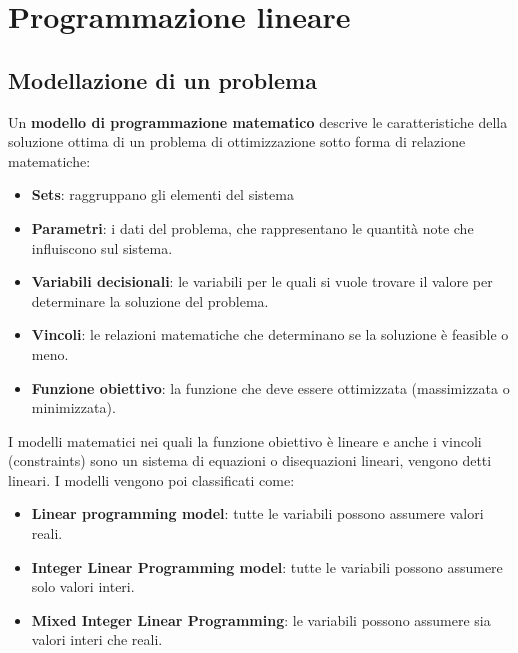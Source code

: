 


\chapter{Programmazione lineare}

\section{Modellazione di un problema}

Un \textbf{modello di programmazione matematico} descrive le caratteristiche della soluzione ottima di un problema di ottimizzazione sotto forma di relazione matematiche:

\begin{itemize}
	\item \textbf{Sets}: raggruppano gli elementi del sistema
	\item \textbf{Parametri}: i dati del problema, che rappresentano le quantità note che influiscono sul sistema.
	\item \textbf{Variabili decisionali}: le variabili per le quali si vuole trovare il valore per determinare la soluzione del problema.
	\item \textbf{Vincoli}: le relazioni matematiche che determinano se la soluzione è feasible o meno.
	\item \textbf{Funzione obiettivo}: la funzione che deve essere ottimizzata (massimizzata o minimizzata).
\end{itemize}

I modelli matematici nei quali la funzione obiettivo è lineare e anche i vincoli (constraints) sono un sistema di equazioni o disequazioni lineari, vengono detti lineari.
I modelli vengono poi classificati come:

\begin{itemize}
	\item \textbf{Linear programming model}: tutte le variabili possono assumere valori reali.
	\item \textbf{Integer Linear Programming model}: tutte le variabili possono assumere solo valori interi.
	\item \textbf{Mixed Integer Linear Programming}: le variabili possono assumere sia valori interi che reali.
\end{itemize}

